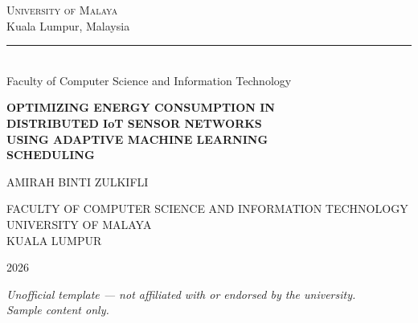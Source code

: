 \documentclass[12pt,a4paper]{report}
\begin{document}
\begin{titlepage}
\thispagestyle{empty}

\begin{center}
\vspace*{0.6cm}
{\Large\scshape\color{umslate} University of Malaya}\\[2pt]
{\normalsize\color{umslate!70} Kuala Lumpur, Malaysia}\\[10pt]
{\color{umgold}\rule{5cm}{1pt}}\\[10pt]
{\small\color{umslate} Faculty of Computer Science and Information Technology}

\vspace{2.2cm}
{\Large\bfseries\color{ummaroon}
OPTIMIZING ENERGY CONSUMPTION IN\\[4pt]
DISTRIBUTED IoT SENSOR NETWORKS\\[4pt]
USING ADAPTIVE MACHINE LEARNING\\[4pt]
SCHEDULING
}

\vspace{2.4cm}
{\large\color{umslate} AMIRAH BINTI ZULKIFLI}

\vspace{1.6cm}
{\normalsize\color{umslate}
FACULTY OF COMPUTER SCIENCE AND INFORMATION TECHNOLOGY\\
UNIVERSITY OF MALAYA\\
KUALA LUMPUR
}

\vspace{1.4cm}
{\normalsize\color{umslate} 2026}

\end{center}

\vfill
\begin{center}
\footnotesize\color{umslate!70}
\textit{Unofficial template --- not affiliated with or endorsed by the university.\\
Sample content only.}
\end{center}
\vspace{0.4cm}
\end{titlepage}
\end{document}
